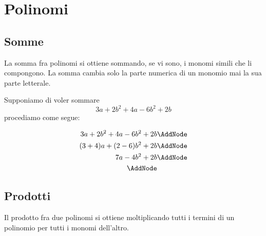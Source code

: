 \chapter{Polinomi}
\label{cha:polinomi}
\section{Somme}
\label{sec:somme}
La somma fra polinomi si ottiene sommando, se vi sono, i monomi simili che li compongono. La somma cambia solo la parte numerica di un monomio mai la sua parte letterale. 
\begin{esempio}
Supponiamo di voler sommare\[ 3a+2b^2+4a-6b^2+2b\] procediamo come segue:
	 \begin{NodesList} %
	 	\begin{align*}
	 		3a+2b^2+4a-6b^2+2b&                           \AddNode\\
	 		(3+4)a+(2-6)b^2+2b&          \AddNode\\                                       		
	 		7a-4b^2+2b&   \AddNode\\
	 		\AddNode
	 	\end{align*}
	  \end{NodesList}
\end{esempio}
\section{Prodotti}
Il prodotto fra due polinomi si ottiene moltiplicando tutti i termini di un polinomio per tutti i monomi dell'altro. 
